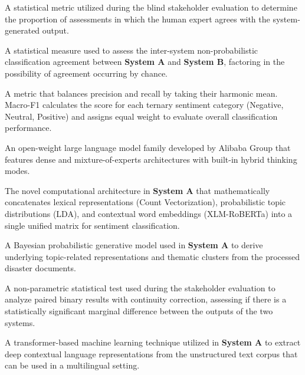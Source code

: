 \documentclass[12pt,a4paper]{report}
\newcommand{\sysA}{\textbf{System A}}
\newcommand{\sysB}{\textbf{System B}}
\newcommand{\xlmr}{XLM-RoBERTa}
\begin{document}
\begin{description}[style=sameline,leftmargin=0pt]
  \item[Agreement Rate.] A statistical metric utilized during the blind
  stakeholder evaluation to determine the proportion of assessments in which
  the human expert agrees with the system-generated output.

  \item[Cohen's Kappa ($\kappa$).] A statistical measure used to assess the
  inter-system non-probabilistic classification agreement between \sysA{} and
  \sysB, factoring in the possibility of agreement occurring by chance.

  \item[F1-Score / Macro-F1.] A metric that balances precision and recall by
  taking their harmonic mean. Macro-F1 calculates the score for each ternary
  sentiment category (Negative, Neutral, Positive) and assigns equal weight to
  evaluate overall classification performance.

  \item[Qwen3.] An open-weight large language model family developed by
  Alibaba Group that features dense and mixture-of-experts architectures with
  built-in hybrid thinking modes.

  \item[Joint Matrix.] The novel computational architecture in \sysA{} that
  mathematically concatenates lexical representations (Count Vectorization),
  probabilistic topic distributions (LDA), and contextual word embeddings
  (\xlmr) into a single unified matrix for sentiment classification.

  \item[Latent Dirichlet Allocation (LDA).] A Bayesian probabilistic
  generative model used in \sysA{} to derive underlying topic-related
  representations and thematic clusters from the processed disaster documents.

  \item[McNemar's Test.] A non-parametric statistical test used during the
  stakeholder evaluation to analyze paired binary results with continuity
  correction, assessing if there is a statistically significant marginal
  difference between the outputs of the two systems.

  \item[XLM-RoBERTa (Robustly Optimized BERT Pretraining Approach).] A
  transformer-based machine learning technique utilized in \sysA{} to extract
  deep contextual language representations from the unstructured text corpus
  that can be used in a multilingual setting.


\end{description}
\end{document}
